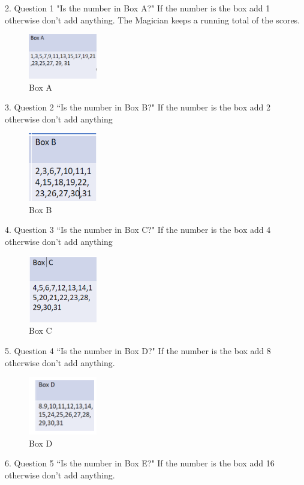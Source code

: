 2.	Question 1 "Is the number in Box A?" If the number is the box add 1 otherwise don't add anything. The Magician keeps a running total of the scores.
\begin{figure}
    \centering
    \includegraphics[width=3cm]{chapters/chapterCT1/boxA.png}
    \caption{Box A}
    \label{fig:Box A}
\end{figure}
3.	Question 2 “Is the number in Box B?" If the number is the box add 2 otherwise don't add anything
\begin{figure}
    \centering
    \includegraphics[width=3cm]{chapters/chapterCT1/BoxB.png}
    \caption{Box B}
    \label{fig:Box B}
\end{figure}
4.	Question 3 “Is the number in Box C?" If the number is the box add 4 otherwise don't add anything
\begin{figure}
    \centering
    \includegraphics[width=3cm]{chapters/chapterCT1/BoxC.png}
    \caption{Box C}
    \label{fig:Box C}
\end{figure}
5.	Question 4 “Is the number in Box D?" If the number is the box add 8 otherwise don't add anything.
\begin{figure}
    \centering
    \includegraphics[width=3cm]{chapters/chapterCT1/figures/boxD.png}
    \caption{Box D}
    \label{fig:Box D}
\end{figure}
6.	Question 5 “Is the number in Box E?" If the number is the box add 16 otherwise don't add anything.
